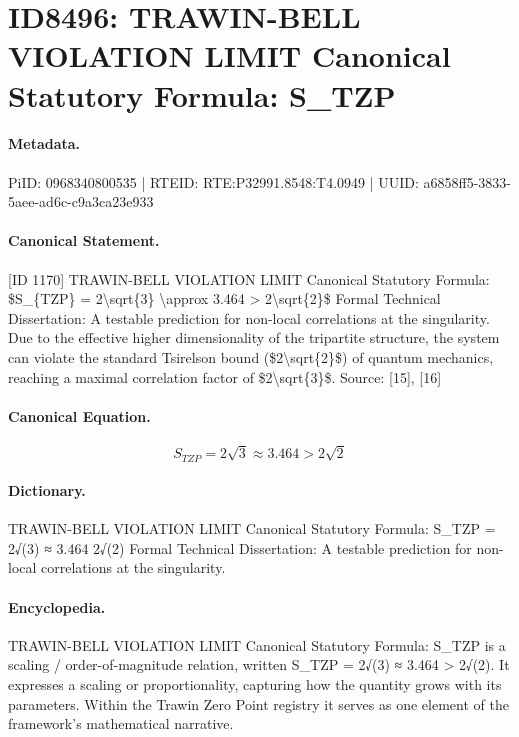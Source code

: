\section*{ID8496: TRAWIN-BELL VIOLATION LIMIT Canonical Statutory Formula: S\_TZP}
\paragraph{Metadata.}
PiID: 0968340800535 | RTEID: RTE:P32991.8548:T4.0949 | UUID: a6858ff5-3833-5aee-ad6c-c9a3ca23e933

\paragraph{Canonical Statement.}
[ID 1170] TRAWIN-BELL VIOLATION LIMIT Canonical Statutory Formula: \$S\_\{TZP\} = 2\textbackslash{}sqrt\{3\} \textbackslash{}approx 3.464 > 2\textbackslash{}sqrt\{2\}\$ Formal Technical Dissertation: A testable prediction for non-local correlations at the singularity. Due to the effective higher dimensionality of the tripartite structure, the system can violate the standard Tsirelson bound (\$2\textbackslash{}sqrt\{2\}\$) of quantum mechanics, reaching a maximal correlation factor of \$2\textbackslash{}sqrt\{3\}\$. Source: [15], [16]

\paragraph{Canonical Equation.}
\[
S_{TZP} = 2\sqrt{3} \approx 3.464 > 2\sqrt{2}
\]

\paragraph{Dictionary.}
TRAWIN-BELL VIOLATION LIMIT Canonical Statutory Formula: S\_TZP = 2√(3) ≈ 3.464 2√(2) Formal Technical Dissertation: A testable prediction for non-local correlations at the singularity.

\paragraph{Encyclopedia.}
TRAWIN-BELL VIOLATION LIMIT Canonical Statutory Formula: S\_TZP is a scaling / order-of-magnitude relation, written S\_TZP = 2√(3) ≈ 3.464 > 2√(2). It expresses a scaling or proportionality, capturing how the quantity grows with its parameters. Within the Trawin Zero Point registry it serves as one element of the framework's mathematical narrative.
